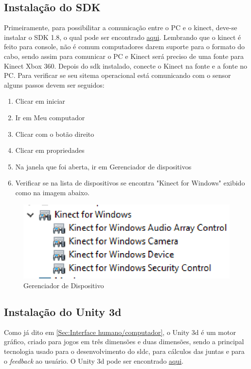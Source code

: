 \subsection{Instalação do SDK}
  Primeiramente, para possibilitar a comunicação entre o PC e o kinect, deve-se
instalar o SDK 1.8, o qual pode ser encontrado \href{https://www.microsoft.com/en-us/download/details.aspx?id=40278}{aqui}.
  Lembrando que o kinect é feito para console, não é comum computadores darem suporte para o formato do
cabo, sendo assim para comunicar o PC e Kinect será preciso de uma fonte para Kinect Xbox 360.
  Depois do sdk instalado, conecte o Kinect na fonte e a fonte no PC. Para verificar se seu sitema operacional
está comunicando com o sensor alguns passos devem ser seguidos:

\begin{enumerate}
  \item Clicar em iniciar
  \item Ir em Meu computador
  \item Clicar com o botão direito
  \item Clicar em propriedades
  \item Na janela que foi aberta, ir em Gerenciador de dispositivos
  \item Verificar se na lista de dispositivos se encontra "Kinect for Windows" exibido como na imagem abaixo.
\end{enumerate}


\begin{figure}[!h]
\centering
\includegraphics [keepaspectratio=true,scale=0.60]{figuras/gerenciadorDispositivo.eps}

\caption{Gerenciador de Dispositivo}
\label{gerenciadorDispositivo}
\end{figure}

\subsection{Instalação do Unity 3d}
  Como já dito em \ref{Sec:Interface humano/computador}, o Unity 3d é um motor gráfico, criado para jogos em três dimensões e duas dimensões,
sendo a principal tecnologia usado para o desenvolvimento do sldc, para cálculos das juntas e para o \textit{feedback} ao usuário.
O Unity 3d pode ser encontrado \href{https://unity3d.com/pt/get-unity/download}{aqui}.


